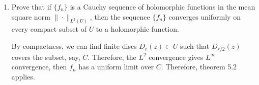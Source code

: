 \documentclass[11pt]{report}
\theoremstyle{mythm}
\let\oldendproof\endproof
\renewenvironment{proof}[1][\proofname]{%
  \oldproof[\normalfont \bfseries #1]%
}{\oldendproof}
\renewcommand*{\proofname}{Proof}
\theoremstyle{myans}
\newcommand{\norm}[1]{\|#1\|}
\begin{document}
\begin{enumerate}
\begin{enumerate}
    \item Prove that if $\{f_n\}$ is a Cauchy sequence of holomorphic functions in the mean square
    norm $\norm{\cdot}_{L^2(U)}$, then the sequence $\{f_n\}$ converges uniformly on every compact
    subset of $U$ to a holomorphic function.
    \begin{proof}
      By compactness, we can find finite discs $D_{r}(z) \subset U$ such that
      $D_{r/2}(z)$ covers the subset, say, $C$. Therefore, the $L^2$ convergence gives $L^\infty$
      convergence, then $f_n$ has a uniform limit over $C$. Therefore, theorem 5.2 applies.
    \end{proof}
  \end{enumerate}
\end{enumerate}
\end{document}
